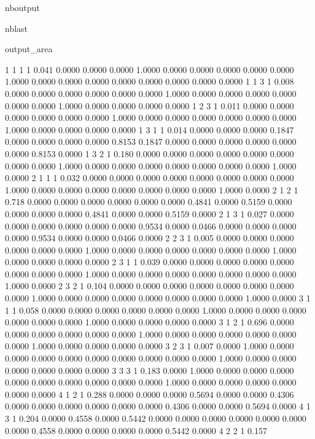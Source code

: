 \documentclass[letterpaper,10pt,english]{sphinxmanual}
\begin{document}
\begin{sphinxuseclass}{nboutput}
\begin{sphinxuseclass}{nblast}
{\begin{sphinxuseclass}{output_area}
\begin{sphinxuseclass}{}
\begin{sphinxVerbatim}[commandchars=\\\{\}]
  1  1  1  1      0.041
 0.0000 0.0000 0.0000 1.0000 0.0000 0.0000 0.0000 0.0000 0.0000
 1.0000 0.0000 0.0000 0.0000 0.0000 0.0000 0.0000 0.0000 0.0000
  1  1  3  1      0.008
 0.0000 0.0000 0.0000 0.0000 0.0000 0.0000 1.0000 0.0000 0.0000
 0.0000 0.0000 0.0000 0.0000 1.0000 0.0000 0.0000 0.0000 0.0000
  1  2  3  1      0.011
 0.0000 0.0000 0.0000 0.0000 0.0000 0.0000 1.0000 0.0000 0.0000
 0.0000 0.0000 0.0000 0.0000 1.0000 0.0000 0.0000 0.0000 0.0000
  1  3  1  1      0.014
 0.0000 0.0000 0.0000 0.1847 0.0000 0.0000 0.0000 0.0000 0.8153
 0.1847 0.0000 0.0000 0.0000 0.0000 0.0000 0.0000 0.8153 0.0000
  1  3  2  1      0.180
 0.0000 0.0000 0.0000 0.0000 0.0000 0.0000 0.0000 0.0000 1.0000
 0.0000 0.0000 0.0000 0.0000 0.0000 0.0000 0.0000 1.0000 0.0000
  2  1  1  1      0.032
 0.0000 0.0000 0.0000 0.0000 0.0000 0.0000 0.0000 0.0000 1.0000
 0.0000 0.0000 0.0000 0.0000 0.0000 0.0000 0.0000 1.0000 0.0000
  2  1  2  1      0.718
 0.0000 0.0000 0.0000 0.0000 0.0000 0.0000 0.4841 0.0000 0.5159
 0.0000 0.0000 0.0000 0.0000 0.4841 0.0000 0.0000 0.5159 0.0000
  2  1  3  1      0.027
 0.0000 0.0000 0.0000 0.0000 0.0000 0.0000 0.9534 0.0000 0.0466
 0.0000 0.0000 0.0000 0.0000 0.9534 0.0000 0.0000 0.0466 0.0000
  2  2  3  1      0.005
 0.0000 0.0000 0.0000 0.0000 0.0000 0.0000 1.0000 0.0000 0.0000
 0.0000 0.0000 0.0000 0.0000 1.0000 0.0000 0.0000 0.0000 0.0000
  2  3  1  1      0.039
 0.0000 0.0000 0.0000 0.0000 0.0000 0.0000 0.0000 0.0000 1.0000
 0.0000 0.0000 0.0000 0.0000 0.0000 0.0000 0.0000 1.0000 0.0000
  2  3  2  1      0.104
 0.0000 0.0000 0.0000 0.0000 0.0000 0.0000 0.0000 0.0000 1.0000
 0.0000 0.0000 0.0000 0.0000 0.0000 0.0000 0.0000 1.0000 0.0000
  3  1  1  1      0.058
 0.0000 0.0000 0.0000 0.0000 0.0000 0.0000 1.0000 0.0000 0.0000
 0.0000 0.0000 0.0000 0.0000 1.0000 0.0000 0.0000 0.0000 0.0000
  3  1  2  1      0.696
 0.0000 0.0000 0.0000 0.0000 0.0000 0.0000 1.0000 0.0000 0.0000
 0.0000 0.0000 0.0000 0.0000 1.0000 0.0000 0.0000 0.0000 0.0000
  3  2  3  1      0.007
 0.0000 1.0000 0.0000 0.0000 0.0000 0.0000 0.0000 0.0000 0.0000
 0.0000 0.0000 1.0000 0.0000 0.0000 0.0000 0.0000 0.0000 0.0000
  3  3  3  1      0.183
 0.0000 1.0000 0.0000 0.0000 0.0000 0.0000 0.0000 0.0000 0.0000
 0.0000 0.0000 1.0000 0.0000 0.0000 0.0000 0.0000 0.0000 0.0000
  4  1  2  1      0.288
 0.0000 0.0000 0.0000 0.5694 0.0000 0.0000 0.4306 0.0000 0.0000
 0.0000 0.0000 0.0000 0.0000 0.4306 0.0000 0.0000 0.5694 0.0000
  4  1  3  1      0.204
 0.0000 0.4558 0.0000 0.5442 0.0000 0.0000 0.0000 0.0000 0.0000
 0.0000 0.0000 0.4558 0.0000 0.0000 0.0000 0.0000 0.5442 0.0000
  4  2  2  1      0.157

\end{sphinxVerbatim}
\end{sphinxuseclass}
\end{sphinxuseclass}}
\end{sphinxuseclass}
\end{sphinxuseclass}
\end{document}
